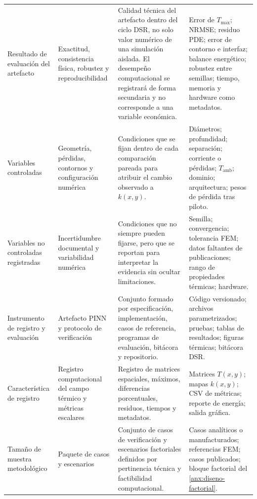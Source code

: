 \documentclass[11pt,a4paper,oneside]{report}
\newcommand{\Tmax}{T_{\max}}
\newcommand{\kx}{k(x,y)}
\begin{document}
\begin{singlespace}
\begin{landscape}
\begin{longtable}{L{4.00cm}L{4.20cm}L{8.20cm}L{6.30cm}}
Resultado de evaluación del artefacto & Exactitud, consistencia física, robustez y reproducibilidad & Calidad técnica del artefacto dentro del ciclo DSR, no solo valor numérico de una simulación aislada. El desempeño computacional se registrará de forma secundaria y no corresponde a una variable económica. & Error de $\Tmax$; NRMSE; residuo PDE; error de contorno e interfaz; balance energético; robustez entre semillas; tiempo, memoria y hardware como metadatos. \\

Variables controladas & Geometría, pérdidas, contornos y configuración numérica & Condiciones que se fijan dentro de cada comparación pareada para atribuir el cambio observado a $\kx$. & Diámetros; profundidad; separación; corriente o pérdidas; $T_{\mathrm{amb}}$; dominio; arquitectura; pesos de pérdida tras piloto. \\

Variables no controladas registradas & Incertidumbre documental y variabilidad numérica & Condiciones que no siempre pueden fijarse, pero que se reportan para interpretar la evidencia sin ocultar limitaciones. & Semilla; convergencia; tolerancia FEM; datos faltantes de publicaciones; rango de propiedades térmicas; hardware. \\

Instrumento de registro y evaluación & Artefacto PINN y protocolo de verificación & Conjunto formado por especificación, implementación, casos de referencia, programas de evaluación, bitácora y repositorio. & Código versionado; archivos parametrizados; pruebas; tablas de resultados; figuras térmicas; bitácora DSR. \\

Característica de registro & Registro computacional del campo térmico y métricas escalares & Registro de matrices espaciales, máximos, diferencias porcentuales, residuos, tiempos y metadatos. & Matrices $T(x,y)$; mapas $\kx$; CSV de métricas; reporte de energía; salida gráfica. \\

Tamaño de muestra metodológico & Paquete de casos y escenarios & Conjunto de casos de verificación y escenarios factoriales definidos por pertinencia técnica y factibilidad computacional. & Casos analíticos o manufacturados; referencias FEM; casos publicados; bloque factorial del \ref{anx:diseno-factorial}. \\

\end{longtable}
\end{landscape}


\end{singlespace}
\end{document}
